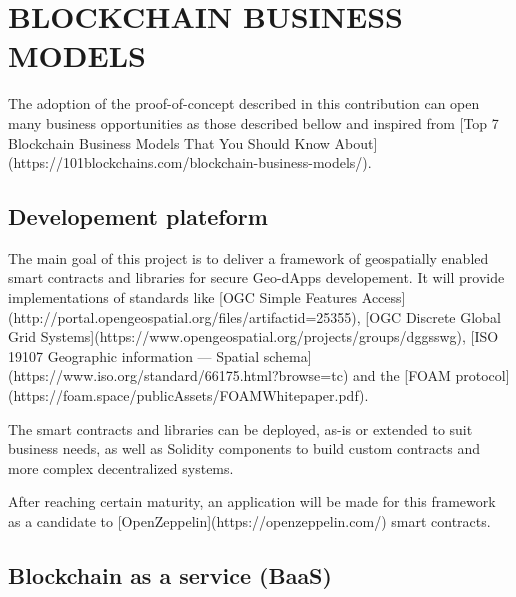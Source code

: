 \documentclass{isprs} %
\begin{document}
\section{BLOCKCHAIN BUSINESS MODELS}\label{sec:BLOCKCHAIN BUSINESS MODELS}

The adoption of the proof-of-concept described in this contribution can open many business opportunities as those described bellow and inspired from [Top 7 Blockchain Business Models That You Should Know About](https://101blockchains.com/blockchain-business-models/).


\subsection{Developement plateform}\label{sec:Developement plateform}

The main goal of this project is to deliver a framework of geospatially enabled smart contracts and libraries for secure Geo-dApps developement. It will provide implementations of standards like [OGC Simple Features Access](http://portal.opengeospatial.org/files/artifactid=25355), [OGC Discrete Global Grid Systems](https://www.opengeospatial.org/projects/groups/dggsswg), [ISO 19107 Geographic information — Spatial schema](https://www.iso.org/standard/66175.html?browse=tc) and the [FOAM protocol](https://foam.space/publicAssets/FOAMWhitepaper.pdf).

The smart contracts and libraries can be deployed, as-is or extended to suit business needs, as well as Solidity components to build custom contracts and more complex decentralized systems. 

After reaching certain maturity, an  application will be made for this framework as a candidate to [OpenZeppelin](https://openzeppelin.com/) smart contracts.

\subsection{Blockchain as a service (BaaS)}\label{sec:Blockchain as a service (BaaS)}
\end{document}

